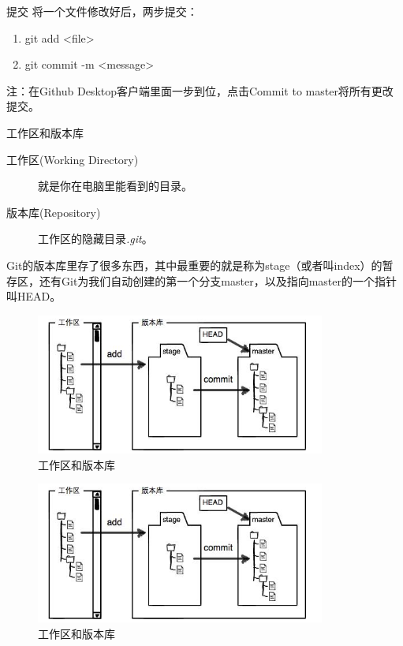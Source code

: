 \documentclass[hyperref,UTF8,10pt]{beamer}
\numberwithin{equation}{section} %
\begin{document}
\begin{frame}{提交}
将一个文件修改好后，两步提交：
\begin{enumerate}
\item git add <file>
\item git commit -m <message>
\end{enumerate}

注：在Github Desktop客户端里面一步到位，点击Commit to master将所有更改提交。
\end{frame}

\begin{frame}{工作区和版本库}

\begin{description}
\item[工作区(Working Directory)] 就是你在电脑里能看到的目录。
\item[版本库(Repository)] 工作区的隐藏目录\emph{.git}。 
\end{description}

Git的版本库里存了很多东西，其中最重要的就是称为stage（或者叫index）的暂存区，还有Git为我们自动创建的第一个分支master，以及指向master的一个指针叫HEAD。

\begin{figure}
\centering
\includegraphics[width=0.85\textwidth]{ku.PNG}
\caption{工作区和版本库}
\end{figure}

\begin{figure}
\centering
\includegraphics[width=0.85\textwidth]{ku.PNG}
\caption{工作区和版本库}
\end{figure}

\end{frame}
\end{document}
